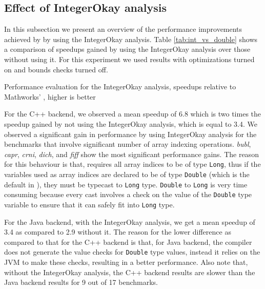 \subsection{Effect of IntegerOkay analysis}    
\label{subsec:intok_perf}

In this subsection we present an overview of the performance improvements
achieved by \mixten by using the IntegerOkay analysis. Table \ref{tab:int_vs_double}
shows a comparison of speedups gained by using the IntegerOkay analysis over
those without using it. For this experiment we used results with \xten
optimizations turned on and bounds checks turned off. 
   
\begin{table}[htbp]
\begin{center} 
\begin{footnotesize}

\end{footnotesize}
\caption{Performance evaluation for the IntegerOkay
analysis, speedups relative to Mathworks' \matlab, higher is better} 
\label{tab:int_vs_double} 
\end{center} 
\end{table}

For the C++ backend, we observed a mean speedup of 6.8 which is two
times the speedup gained by not using the IntegerOkay analysis, which is equal
to 3.4. We observed a significant gain in performance by using IntegerOkay
analysis for the benchmarks that involve significant number of array indexing
operations. \emph{bubl}, \emph{capr}, \emph{crni}, \emph{dich}, and \emph{fiff} 
show the most significant performance gains. The reason for this
behaviour is that, \xten requires all array indices to be of type \texttt{Long},
thus if the variables used as array indices are declared to be of type
\texttt{Double} (which is the default in \matlab), they must be typecast to
\texttt{Long} type. \texttt{Double} to \texttt{Long} is very time consuming
because every cast involves a check on the value of the \texttt{Double} type
variable to ensure that it can safely fit into \texttt{Long} type. 

For the Java backend, with the IntegerOkay analysis, we get a mean speedup of
3.4 as compared to 2.9 without it. The reason for the lower difference as
compared to that for the C++ backend is that, for Java backend, the \xten
compiler does not generate the value checks for \texttt{Double} type values,
instead it relies on the JVM to make  these checks, resulting in a better
performance.  Also note that, without the IntegerOkay analysis, the C++ backend
results are slower than the Java backend results for 9 out of 17 benchmarks.

